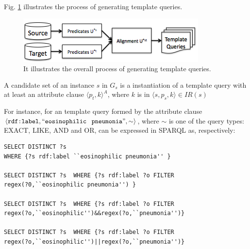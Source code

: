 Fig. \ref{fig:template} illustrates the process of generating template queries.
 
\begin{figure} [h]
\vspace{-10pt}
\centering
\includegraphics[scale=0.5]{p7.png}
\caption{It illustrates the overall process of generating template queries. } 
\vspace{-10pt}
\label{fig:template}
\end{figure}
 
\begin{definition}   A candidate set of an instance $s$ in $G_s$ is a instantiation of a template query with at least an attribute clause $\langle p_t,k \rangle^A$, where $k$ is in $\langle s,p_s,k \rangle \in IR(s)$
\end{definition} 

For instance, for an template query formed by the attribute clause $\langle\verb+rdf:label+,``\verb+eosinophilic+$  $\verb+pneumonia+",\sim\rangle$, where $\sim$ is one of the query types: EXACT, LIKE, AND and OR, can be expressed in SPARQL as, respectively: 

\begin{footnotesize} 
\begin{verbatim}
SELECT DISTINCT ?s  
WHERE {?s rdf:label ``eosinophilic pneumonia'' } 
 
SELECT DISTINCT ?s  WHERE {?s rdf:label ?o FILTER
regex(?0,``eosinophilic pneumonia'') } 

SELECT DISTINCT ?s  WHERE {?s rdf:label ?o FILTER 
regex(?o,``eosinophilic'')&&regex(?o,``pneumonia'')} 

SELECT DISTINCT ?s  WHERE {?s rdf:label ?o FILTER
regex(?o,``eosinophilic'')||regex(?o,``pneumonia'')} 
\end{verbatim}
\end{footnotesize}

